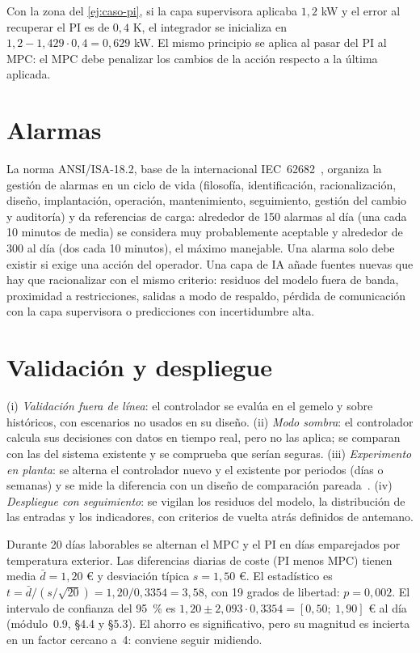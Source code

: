 Con la zona del \cref{ej:caso-pi}, si la capa supervisora aplicaba $1{,}2$ kW y el error al recuperar el PI es de $0{,}4$ K, el integrador se inicializa en $1{,}2-1{,}429\cdot0{,}4=0{,}629$ kW. El mismo principio se aplica al pasar del PI al MPC: el MPC debe penalizar los cambios de la acción respecto a la última aplicada.

\section{Alarmas}

La norma ANSI/ISA-18.2, base de la internacional IEC~62682~\cite{isa182}, organiza la gestión de alarmas en un ciclo de vida (filosofía, identificación, racionalización, diseño, implantación, operación, mantenimiento, seguimiento, gestión del cambio y auditoría) y da referencias de carga: alrededor de 150 alarmas al día (una cada 10 minutos de media) se considera muy probablemente aceptable y alrededor de 300 al día (dos cada 10 minutos), el máximo manejable. Una alarma solo debe existir si exige una acción del operador. Una capa de IA añade fuentes nuevas que hay que racionalizar con el mismo criterio: residuos del modelo fuera de banda, proximidad a restricciones, salidas a modo de respaldo, pérdida de comunicación con la capa supervisora o predicciones con incertidumbre alta.

\section{Validación y despliegue}

\begin{definicion}\label{def:validar}
(i) \emph{Validación fuera de línea}: el controlador se evalúa en el gemelo y sobre históricos, con escenarios no usados en su diseño. (ii) \emph{Modo sombra}: el controlador calcula sus decisiones con datos en tiempo real, pero no las aplica; se comparan con las del sistema existente y se comprueba que serían seguras. (iii) \emph{Experimento en planta}: se alterna el controlador nuevo y el existente por periodos (días o semanas) y se mide la diferencia con un diseño de comparación pareada~\cite[cap.~2]{montgomery}. (iv) \emph{Despliegue con seguimiento}: se vigilan los residuos del modelo, la distribución de las entradas y los indicadores, con criterios de vuelta atrás definidos de antemano.
\end{definicion}

\begin{ejemplo}\label{ej:contraste}
Durante 20 días laborables se alternan el MPC y el PI en días emparejados por temperatura exterior. Las diferencias diarias de coste (PI menos MPC) tienen media $\bar d=1{,}20$ € y desviación típica $s=1{,}50$ €. El estadístico es $t=\bar d/(s/\sqrt{20})=1{,}20/0{,}3354=3{,}58$, con 19 grados de libertad: $p=0{,}002$. El intervalo de confianza del 95~\% es $1{,}20\pm2{,}093\cdot0{,}3354=[0{,}50;\ 1{,}90]$ € al día (módulo~0.9, §4.4 y §5.3). El ahorro es significativo, pero su magnitud es incierta en un factor cercano a~4: conviene seguir midiendo.
\end{ejemplo}

